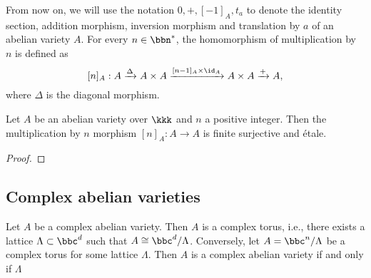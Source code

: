     From now on, we will use the notation \(0, +, [-1]_A, t_a\) to denote the identity section, addition morphism, inversion morphism and translation by \(a\) of an abelian variety \(A\).
    For every \(n \in \bbn^*\), the homomorphism of multiplication by \(n\) is defined as 
    \[ [n]_A: A \xrightarrow{\Delta} A \times A \xrightarrow{[n-1]_A\times \id_A} A \times A \xrightarrow{+} A, \]
    where \(\Delta\) is the diagonal morphism.

    \begin{proposition}\label{prop: multiplication by n is etale}
        Let \(A\) be an abelian variety over \(\kkk\) and \(n\) a positive integer.
        Then the multiplication by \(n\) morphism \([n]_A: A \to A\) is finite surjective and \'etale.
    \end{proposition}
    \begin{proof}
    \end{proof}

\subsection{Complex abelian varieties}

    \begin{theorem}\label{thm: complex abelian varieties are complex tori}
        Let \(A\) be a complex abelian variety.
        Then \(A\) is a complex torus, i.e., there exists a lattice \(\Lambda \subset \bbc^d\) such that \(A \cong \bbc^d / \Lambda\).
        Conversely, let \(A = \bbc^n/\Lambda\) be a complex torus for some lattice \(\Lambda\).
        Then \(A\) is a complex abelian variety if and only if \(\Lambda\)  
    \end{theorem}


